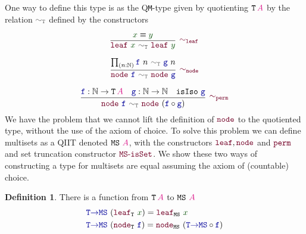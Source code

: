\documentclass[twoside,11pt,openright]{report}
\theoremstyle{plain} %
\theoremstyle{definition}
\newtheorem{defn}[thm]{Definition}%
\theoremstyle{remark}
\newcommand*{\term}[1]{\textcolor{green!30!black}{#1}} %
\newcommand*{\type}[1]{\textcolor{magenta!90!black}{#1}}
\newcommand*{\relation}[1]{\textcolor{gray!75!black}{\ensuremath{\mathtt{#1}}}}
\newcommand*{\function}[1]{\textcolor{blue!60!black}{\ensuremath{\mathtt{#1}}}}
\newcommand*{\constructor}[1]{\textcolor{purple!60!black}{\ensuremath{\mathtt{#1}}}}
\newcommand*{\typeformer}[1]{\ensuremath{\mathtt{#1}}}
\begin{document}
One way to define this type is as the Q\texttt{M}-type given by quotienting \(\typeformer{T}\,\type{A}\) by the relation \(\relation{\sim_T}\) defined by the constructors
\begin{center}
  \strut
  \hfill
  \begin{minipage}{0.35\linewidth}
    \begin{equation}
      \vcenter{\infer[\constructor{\sim_{leaf}}]{\constructor{leaf}~\term{x}~\relation{\sim_{T}}~\constructor{leaf}~\term{y}}{\term{x} \equiv \term{y}}}
    \end{equation}
  \end{minipage}
  \hfill
  \begin{minipage}{0.35\linewidth}
    \begin{equation}
      \vcenter{\infer[\constructor{\sim_{node}}]{\constructor{node}~\function{f}~\relation{\sim_T}~\constructor{node}~\function{g}}{\prod_{(n : \mathbb{N})} \function{f}~n~\relation{\sim_T}~\function{g}~n}}
    \end{equation}
  \end{minipage}
  \hfill
  \strut
\end{center}
\begin{equation}
  \vcenter{\infer[\constructor{\sim_{perm}}]{\constructor{node}~\function{f}~\relation{\sim_T}~\constructor{node}~(\function{f} \circ \function{g})}{\function{f} : \mathbb{N} \rightarrow \typeformer{T}\,\type{A} & \function{g} : \mathbb{N} \rightarrow \mathbb{N} & \mathtt{isIso}~\function{g}}}
\end{equation}
We have the problem that we cannot lift the definition of \(\constructor{node}\) to the quotiented type, without the use of the axiom of choice. To solve this problem we can define multisets as a QIIT denoted \(\typeformer{MS}~\type{A}\), with the constructors \(\constructor{leaf}, \constructor{node}\) and \(\constructor{perm}\) and set truncation constructor \(\constructor{MS\text{-}isSet}\). We show these two ways of constructing a type for multisets are equal assuming the axiom of (countable) choice.
\begin{defn}
  There is a function from \(\typeformer{T}\,\type{A}\) to \(\typeformer{MS}~\type{A}\)
  \begin{equation}
    \begin{aligned}
      &\function{T{\rightarrow}MS}~(\constructor{leaf}_{\typeformer{T}}~\term{x}) = \constructor{leaf}_{\typeformer{MS}}~\term{x} \\
      &\function{T{\rightarrow}MS}~(\constructor{node}_{\typeformer{T}}~\function{f}) = \constructor{node}_{\typeformer{MS}}~(\function{T{\rightarrow}MS} \circ \function{f})
    \end{aligned}
  \end{equation}
\end{defn}
\end{document}
